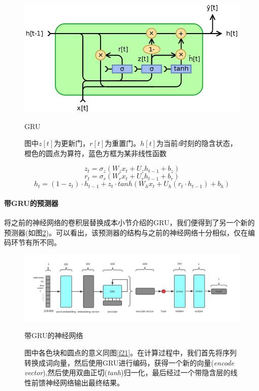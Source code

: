 \begin{figure}[htb]
    \centering
    \includegraphics[width=11.5cm]{GRU.png}
    \caption{GRU}
    \captionsetup{font=footnotesize,margin=30pt}\caption*{图中\(z[t]\)为更新门，\(r[t]\)为重置门。\(h[t]\)为当前\textit{t}时刻的隐含状态，橙色的圆点为算符，蓝色方框为某非线性函数}
    \label{f22}
\end{figure}

\begin{equation}\label{3-9}
z_t=\sigma_z(W_zx_t+U_zh_{t-1}+b_z) 
\end{equation}
\begin{equation}\label{3-10}
r_t=\sigma_r(W_rx_t+U_rh_{t-1}+b_r) 
\end{equation}
\begin{equation}\label{3-11}
h_t=(1-z_t)\cdot h_{t-1}+z_t\cdot tanh(W_hx_t+U_h(r_t\cdot h_{t-1})+b_h)
\end{equation}

\paragraph{带GRU的预测器}
将之前的神经网络的卷积层替换成本小节介绍的GRU，我们便得到了另一个新的预测器(如图\ref{f23})。可以看出，该预测器的结构与之前的神经网络十分相似，仅在编码环节有所不同。

\begin{figure}[htb]
    \centering
    \includegraphics[width=16cm]{gru_ranker.png}
    \caption{带GRU的神经网络}
    \captionsetup{font=footnotesize,margin=30pt}\caption*{图中各色块和圆点的意义同图\ref{f21}。在计算过程中，我们首先将序列转换成词向量，然后使用GRU进行编码，获得一个新的向量(\textit{encode vector}),然后使用双曲正切(\textit{tanh})归一化，最后经过一个带隐含层的线性前馈神经网络输出最终结果。}
    \label{f23}
\end{figure}
